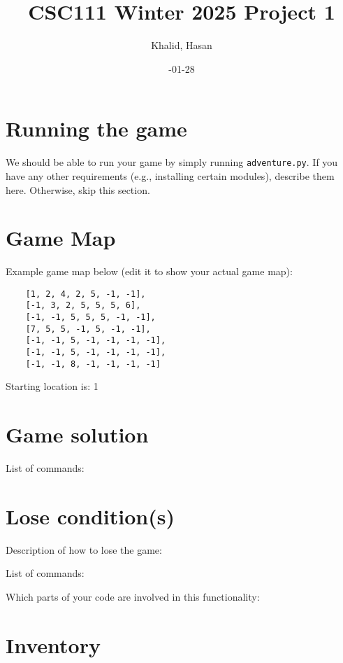 \documentclass[11pt]{article}
\title{CSC111 Winter 2025 Project 1}
\author{Khalid, Hasan}
\date{\2025-01-28}
\begin{document}
\maketitle

\section*{Running the game}
We should be able to run your game by simply running \texttt{adventure.py}. If you have any other requirements (e.g., installing certain modules), describe them here. Otherwise, skip this section.

\section*{Game Map}
Example game map below (edit it to show your actual game map):

\begin{verbatim}
    [1, 2, 4, 2, 5, -1, -1],
    [-1, 3, 2, 5, 5, 5, 6],
    [-1, -1, 5, 5, 5, -1, -1],
    [7, 5, 5, -1, 5, -1, -1],
    [-1, -1, 5, -1, -1, -1, -1],
    [-1, -1, 5, -1, -1, -1, -1],
    [-1, -1, 8, -1, -1, -1, -1]

\end{verbatim}

Starting location is: 1

\section*{Game solution}
List of commands:

\section*{Lose condition(s)}
Description of how to lose the game:

List of commands:

Which parts of your code are involved in this functionality:


\section*{Inventory}
\end{document}
